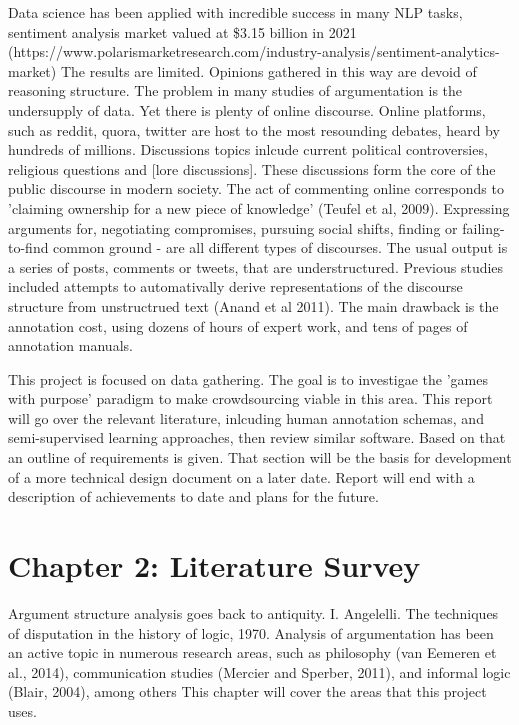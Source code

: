 \documentclass{article}
\begin{document}
Data science has been applied with incredible success in many NLP tasks, sentiment analysis market valued at \$3.15 billion in 2021 (https://www.polarismarketresearch.com/industry-analysis/sentiment-analytics-market)
The results are limited. Opinions gathered in this way are devoid of reasoning structure.
The problem in many studies of argumentation is the undersupply of data.
Yet there is plenty of online discourse.
Online platforms, such as reddit, quora, twitter are host to the most resounding debates, heard by hundreds of millions. 
Discussions topics inlcude current political controversies, religious questions and [lore discussions].
These discussions form the core of the public discourse in modern society. 
The act of commenting online corresponds to 'claiming ownership for a new piece of knowledge' (Teufel et al, 2009).
Expressing arguments for, negotiating compromises, pursuing social shifts, finding or failing-to-find common ground - are all different types of discourses. 
The usual output is a series of posts, comments or tweets, that are understructured. 
Previous studies included attempts to automativally derive representations of the discourse structure from unstructrued text (Anand et al 2011).
The main drawback is the annotation cost, using dozens of hours of expert work, and tens of pages of annotation manuals.

This project is focused on data gathering. The goal is to investigae the 'games with purpose' paradigm to make crowdsourcing viable in this area.
This report will go over the relevant literature, inlcuding human annotation schemas, and semi-supervised learning approaches, then review similar software. Based on that an outline of requirements is given. 
That section will be the basis for development of a more technical design document on a later date.
Report will end with a description of achievements to date and plans for the future.

\section{Chapter 2: Literature Survey}
Argument structure analysis goes back to antiquity. I. Angelelli. The techniques of disputation in the history of logic, 1970.
Analysis of argumentation has been an active topic in numerous research areas, such as philosophy (van Eemeren et al., 2014), communication studies (Mercier and Sperber, 2011), and informal logic (Blair, 2004), among others
This chapter will cover the areas that this project uses.
\end{document}
